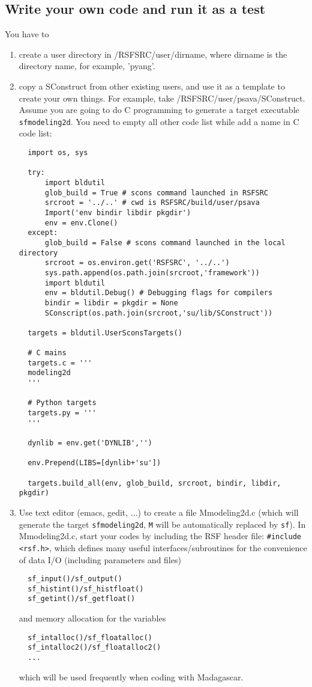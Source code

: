 \subsection{Write your own code and run it as a test}
You have to
\begin{enumerate}
 \item create a user directory in /RSFSRC/user/dirname, where dirname is the directory name, for example, 'pyang'.
 \item copy a SConstruct from other existing users, and use it as a template to create your own things. For example, take /RSFSRC/user/psava/SConstruct. Assume you are going to do C programming to generate a target executable \texttt{sfmodeling2d}. You need to empty all other code list while add a name in C code list:
 \begin{verbatim}
  import os, sys

  try:
      import bldutil
      glob_build = True # scons command launched in RSFSRC
      srcroot = '../..' # cwd is RSFSRC/build/user/psava
      Import('env bindir libdir pkgdir')
      env = env.Clone()
  except:
      glob_build = False # scons command launched in the local directory
      srcroot = os.environ.get('RSFSRC', '../..')
      sys.path.append(os.path.join(srcroot,'framework'))
      import bldutil
      env = bldutil.Debug() # Debugging flags for compilers
      bindir = libdir = pkgdir = None
      SConscript(os.path.join(srcroot,'su/lib/SConstruct'))

  targets = bldutil.UserSconsTargets()

  # C mains
  targets.c = '''
  modeling2d
  '''

  # Python targets
  targets.py = '''
  '''

  dynlib = env.get('DYNLIB','')

  env.Prepend(LIBS=[dynlib+'su'])

  targets.build_all(env, glob_build, srcroot, bindir, libdir, pkgdir)
 \end{verbatim}

 \item Use text editor (emacs, gedit, ...) to create a file Mmodeling2d.c (which will generate the target \texttt{sfmodeling2d}, \texttt{M} will be automatically replaced by \texttt{sf}). In Mmodeling2d.c, start your codes by  including the RSF header file: \texttt{\#include <rsf.h>}, which defines many useful interfaces/subroutines for the convenience of data I/O (including parameters and files)
 \begin{verbatim}
  sf_input()/sf_output()
  sf_histint()/sf_histfloat()
  sf_getint()/sf_getfloat()
 \end{verbatim}
 and memory allocation for the variables
 \begin{verbatim}  
  sf_intalloc()/sf_floatalloc()
  sf_intalloc2()/sf_floatalloc2()
  ...
 \end{verbatim}
 which will be used frequently when coding with Madagascar.


\end{enumerate}
